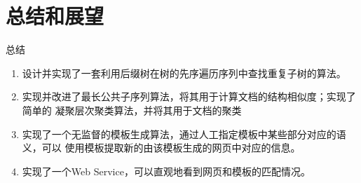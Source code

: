 \section{总结和展望}
\label{sec-4}
\begin{frame}[label=sec-4-1]{总结}
\begin{enumerate}[<+->]
\item 设计并实现了一套利用后缀树在树的先序遍历序列中查找重复子树的算法。
\item 实现并改进了最长公共子序列算法，将其用于计算文档的结构相似度；实现了简单的
凝聚层次聚类算法，并将其用于文档的聚类
\item 实现了一个无监督的模板生成算法，通过人工指定模板中某些部分对应的语义，可以
使用模板提取新的由该模板生成的网页中对应的信息。
\item 实现了一个Web Service，可以直观地看到网页和模板的匹配情况。
\end{enumerate}
\end{frame}
